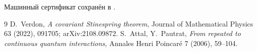 Машинный сертификат сохранён в
.

\begin{thebibliography}{9}
D.~Verdon,
\emph{A covariant Stinespring theorem},
Journal of Mathematical Physics 63 (2022), 091705; arXiv:2108.09872.
S.~Attal, Y.~Pautrat,
\emph{From repeated to continuous quantum interactions},
Annales Henri Poincar\'e 7 (2006), 59--104.
\end{thebibliography}